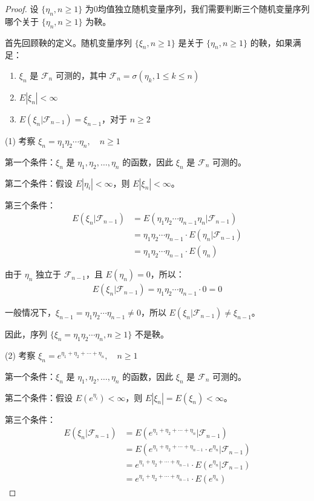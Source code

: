 \documentclass[lang=cn,10pt,thmcnt=section]{elegantbook}
\begin{document}
\begin{proof}
	设 $\{\eta_n, n \geq 1\}$ 为0均值独立随机变量序列，我们需要判断三个随机变量序列哪个关于 $\{\eta_n, n \geq 1\}$ 为鞅。

首先回顾鞅的定义。随机变量序列 $\{\xi_n, n \geq 1\}$ 是关于 $\{\eta_n, n \geq 1\}$ 的鞅，如果满足：
\begin{enumerate}
    \item $\xi_n$ 是 $\mathcal{F}_n$ 可测的，其中 $\mathcal{F}_n = \sigma(\eta_k, 1 \leq k \leq n)$
    \item $E|\xi_n| < \infty$
    \item $E(\xi_n|\mathcal{F}_{n-1}) = \xi_{n-1}$，对于 $n \geq 2$
\end{enumerate}

(1) 考察 $\xi_n = \eta_1 \eta_2 \cdots \eta_n, \quad n \geq 1$

第一个条件：$\xi_n$ 是 $\eta_1, \eta_2, \ldots, \eta_n$ 的函数，因此 $\xi_n$ 是 $\mathcal{F}_n$ 可测的。

第二个条件：假设 $E|\eta_i| < \infty$，则 $E|\xi_n| < \infty$。

第三个条件：
\begin{align}
E(\xi_n|\mathcal{F}_{n-1}) &= E(\eta_1 \eta_2 \cdots \eta_{n-1} \eta_n|\mathcal{F}_{n-1}) \\
&= \eta_1 \eta_2 \cdots \eta_{n-1} \cdot E(\eta_n|\mathcal{F}_{n-1}) \\
&= \eta_1 \eta_2 \cdots \eta_{n-1} \cdot E(\eta_n)
\end{align}

由于 $\eta_n$ 独立于 $\mathcal{F}_{n-1}$，且 $E(\eta_n) = 0$，所以：
\begin{align}
E(\xi_n|\mathcal{F}_{n-1}) = \eta_1 \eta_2 \cdots \eta_{n-1} \cdot 0 = 0
\end{align}

一般情况下，$\xi_{n-1} = \eta_1 \eta_2 \cdots \eta_{n-1} \neq 0$，所以 $E(\xi_n|\mathcal{F}_{n-1}) \neq \xi_{n-1}$。

因此，序列 $\{\xi_n = \eta_1 \eta_2 \cdots \eta_n, n \geq 1\}$ 不是鞅。

(2) 考察 $\xi_n = e^{\eta_1 + \eta_2 + \cdots + \eta_n}, \quad n \geq 1$

第一个条件：$\xi_n$ 是 $\eta_1, \eta_2, \ldots, \eta_n$ 的函数，因此 $\xi_n$ 是 $\mathcal{F}_n$ 可测的。

第二个条件：假设 $E(e^{\eta_i}) < \infty$，则 $E|\xi_n| = E(\xi_n) < \infty$。

第三个条件：
\begin{align}
E(\xi_n|\mathcal{F}_{n-1}) &= E(e^{\eta_1 + \eta_2 + \cdots + \eta_n}|\mathcal{F}_{n-1}) \\
&= E(e^{\eta_1 + \eta_2 + \cdots + \eta_{n-1}} \cdot e^{\eta_n}|\mathcal{F}_{n-1}) \\
&= e^{\eta_1 + \eta_2 + \cdots + \eta_{n-1}} \cdot E(e^{\eta_n}|\mathcal{F}_{n-1}) \\
&= e^{\eta_1 + \eta_2 + \cdots + \eta_{n-1}} \cdot E(e^{\eta_n})
\end{align}


\end{proof}
\end{document}
